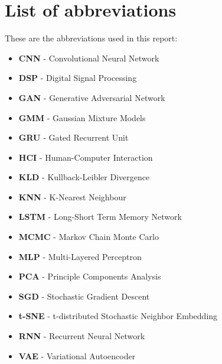 \chapter*{List of abbreviations}

These are the abbreviations used in this report: 
\begin{itemize}
\item \textbf{CNN} - Convolutional Neural Network
\item \textbf{DSP} - Digital Signal Processing
\item \textbf{GAN} - Generative Adversarial Network
\item \textbf{GMM} - Gaussian Mixture Models
\item \textbf{GRU} - Gated Recurrent Unit
\item \textbf{HCI} - Human-Computer Interaction
\item \textbf{KLD} - Kullback-Leibler Divergence
\item \textbf{KNN} - K-Nearest Neighbour
\item \textbf{LSTM} - Long-Short Term Memory Network
\item \textbf{MCMC} - Markov Chain Monte Carlo
\item \textbf{MLP} - Multi-Layered Perceptron
\item \textbf{PCA} - Principle Components Analysis
\item \textbf{SGD} - Stochastic Gradient Descent
\item \textbf{t-SNE} - t-distributed Stochastic Neighbor Embedding
\item \textbf{RNN} - Recurrent Neural Network
\item \textbf{VAE} - Variational Autoencoder
\end{itemize}